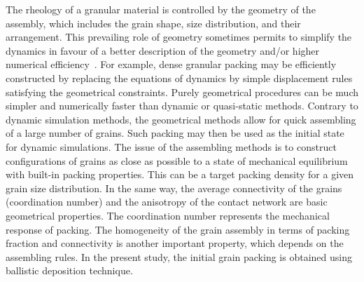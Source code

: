 The rheology of a granular material is controlled by the geometry of the 
assembly, which includes 
the grain shape, size distribution, and their arrangement. This prevailing 
role of geometry 
sometimes permits to simplify the dynamics in favour of a better description of 
the geometry 
and/or 
higher numerical efficiency~\citep{Radjai2011}. For example, dense granular 
packing may be 
efficiently constructed by replacing the equations of dynamics by simple 
displacement rules 
satisfying the geometrical constraints. Purely geometrical procedures can be 
much simpler and 
numerically faster than dynamic or quasi-static methods. Contrary to dynamic 
simulation methods, 
the geometrical methods allow for quick assembling of a large number of 
grains. Such packing 
may 
then be used as the initial state for dynamic simulations. The issue of the 
assembling methods is 
to construct configurations of grains as close as possible to a state of 
mechanical equilibrium 
with built-in packing properties. This can be a target packing density for a 
given grain size 
distribution. In the same way, the average connectivity of the grains 
(coordination number) and 
the anisotropy of the contact network are basic geometrical properties. The 
coordination number 
represents the mechanical response of packing. The homogeneity of the grain 
assembly in terms 
of 
packing fraction and connectivity is another important property, which depends 
on the assembling 
rules. In the present study, the initial grain packing is obtained using 
ballistic deposition 
technique.

